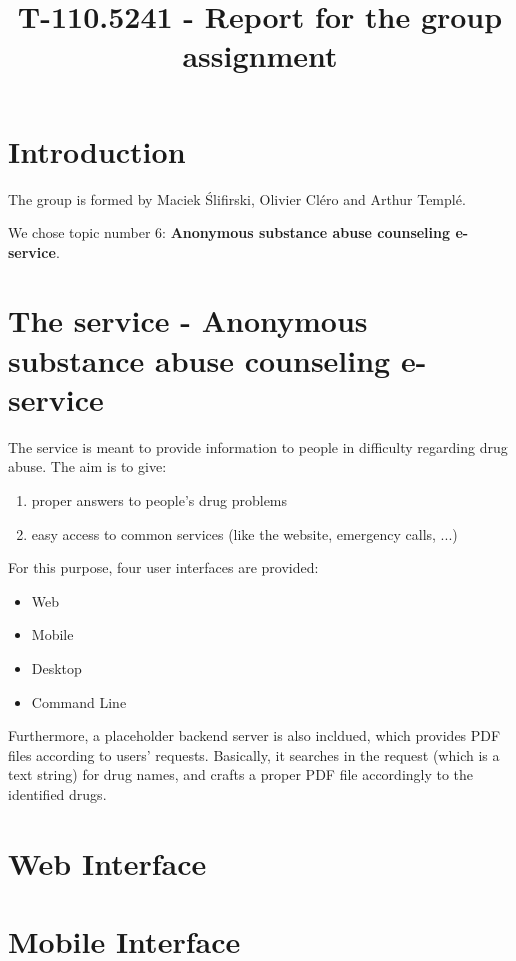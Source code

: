 \documentclass[a4paper,12pt, twocolumn]{article}
\title{T-110.5241 - Report for the group assignment}
\begin{document}
\maketitle

\section*{Introduction}

The group is formed by Maciek \'{S}lifirski, Olivier Cl\'{e}ro and Arthur Templ\'{e}.

We chose topic number 6: \textbf{Anonymous substance abuse counseling e-service}.

\section*{The service - Anonymous substance abuse counseling e-service}

The service is meant to provide information to people in difficulty regarding drug abuse.
The aim is to give:
\begin{enumerate}
 \item proper answers to people's drug problems
 \item easy access to common services (like the website, emergency calls, ...)
\end{enumerate}

For this purpose, four user interfaces are provided:

\begin{itemize}
 \item Web
 \item Mobile
 \item Desktop
 \item Command Line
\end{itemize}

Furthermore, a placeholder backend server is also incldued, which provides PDF files according to users' requests. Basically, it searches in the request (which is a text string) for drug names, and crafts a proper PDF file accordingly to the identified drugs.

\section*{Web Interface}

\section*{Mobile Interface}
\end{document}
